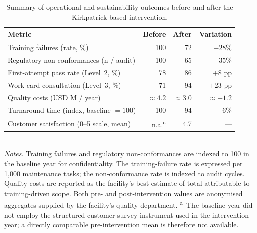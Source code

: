 \begin{table}[!htbp]
  \centering
  \caption{Summary of operational and sustainability outcomes before and
           after the Kirkpatrick-based intervention.}
  \label{tab:before-after}
  \small
  \begin{tabular}{@{}p{6.5cm}rrr@{}}
    \toprule
    \textbf{Metric} & \textbf{Before} & \textbf{After} & \textbf{Variation} \\
    \midrule
    Training failures (rate, \%)               & 100        & 72         & $-28\%$ \\
    Regulatory non-conformances (n / audit)    & 100        & 65         & $-35\%$ \\
    First-attempt pass rate (Level~2, \%)      & 78         & 86         & $+8$ pp \\
    Work-card consultation (Level~3, \%)       & 71         & 94         & $+23$ pp \\
    Quality costs (USD M / year)               & $\approx 4.2$ & $\approx 3.0$ & $\approx -1.2$ \\
    Turnaround time (index, baseline $=100$)   & 100        & 94         & $-6\%$ \\
    Customer satisfaction (0--5 scale, mean) & n.a.\textsuperscript{a} & 4.7 & --- \\
    \bottomrule
  \end{tabular}\\[2pt]
  \footnotesize
  \emph{Notes.} Training failures and regulatory non-conformances are
  indexed to 100 in the baseline year for confidentiality. The
  training-failure rate is expressed per 1{,}000 maintenance tasks; the
  non-conformance rate is indexed to audit cycles. Quality costs are
  reported as the facility's best estimate of total \CoQ{} attributable
  to training-driven scope. Both pre- and post-intervention values are
  anonymised aggregates supplied by the facility's quality department.
  \textsuperscript{a}~The baseline year did not employ the structured
  customer-survey instrument used in the intervention year; a directly
  comparable pre-intervention mean is therefore not available.
\end{table}
